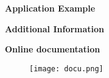 \begin{frame}\begin{center}
\LARGE\textbf{Application Example}
\end{center}\end{frame}


\begin{frame}\begin{center}
\LARGE\textbf{Additional Information}
\end{center}\end{frame}



\begin{frame}
\textbf{Online documentation}
\begin{figure}
  \texttt{[image: docu.png]}
\end{figure}

\end{frame}
